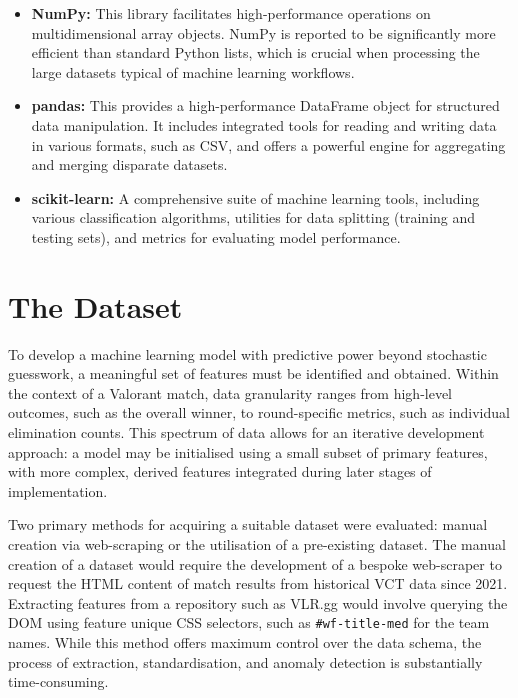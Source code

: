 \begin{itemize}
\item \textbf{NumPy:} This library facilitates high-performance operations on multidimensional array objects. NumPy is reported to be significantly more efficient than standard Python lists, which is crucial when processing the large datasets typical of machine learning workflows. \cite{numpy_site}
\item \textbf{pandas:} This provides a high-performance DataFrame object for structured data manipulation. It includes integrated tools for reading and writing data in various formats, such as CSV, and offers a powerful engine for aggregating and merging disparate datasets. \cite{pandas_site}
\item \textbf{scikit-learn:} A comprehensive suite of machine learning tools, including various classification algorithms, utilities for data splitting (training and testing sets), and metrics for evaluating model performance. \cite{sklearn_site}
\end{itemize}

\section{The Dataset}
\label{sec:dataset}
To develop a machine learning model with predictive power beyond stochastic guesswork, a meaningful set of features must be identified and obtained. Within the context of a Valorant match, data granularity ranges from high-level outcomes, such as the overall winner, to round-specific metrics, such as individual elimination counts. This spectrum of data allows for an iterative development approach: a model may be initialised using a small subset of primary features, with more complex, derived features integrated during later stages of implementation.

Two primary methods for acquiring a suitable dataset were evaluated: manual creation via web-scraping or the utilisation of a pre-existing dataset. The manual creation of a dataset would require the development of a bespoke web-scraper to request the HTML content of match results from historical VCT data since 2021. Extracting features from a repository such as VLR.gg \cite{vlr_gg} would involve querying the DOM using feature unique CSS selectors, such as \texttt{\#wf-title-med} for the team names. While this method offers maximum control over the data schema, the process of extraction, standardisation, and anomaly detection is substantially time-consuming.

